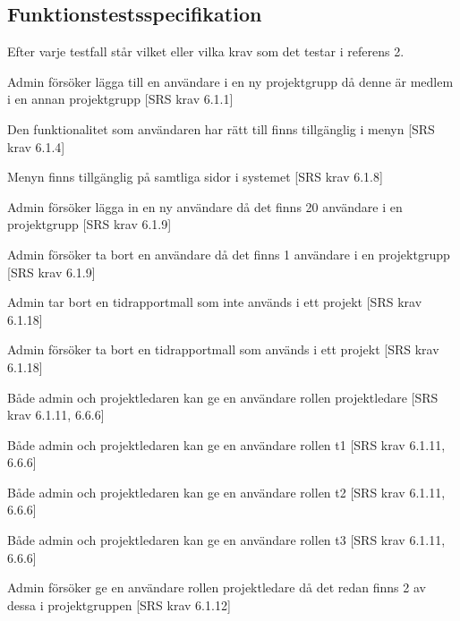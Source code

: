 \documentclass[a4paper]{article}
\begin{document}
\begin{appendices}

\section{Funktionstestsspecifikation}
Efter varje testfall står vilket eller vilka krav som det testar i referens 2.

\begin{FT}


\item
Admin försöker lägga till en användare i en ny projektgrupp då denne är medlem i en annan projektgrupp [SRS krav 6.1.1]

\item
Den funktionalitet som användaren har rätt till finns tillgänglig i menyn [SRS krav 6.1.4]

\item
Menyn finns tillgänglig på samtliga sidor i systemet [SRS krav 6.1.8]

\item
Admin försöker lägga in en ny användare då det finns 20 användare i en projektgrupp [SRS krav 6.1.9]

\item
Admin försöker ta bort en användare då det finns 1 användare i en projektgrupp [SRS krav 6.1.9]

\item
Admin tar bort en tidrapportmall som inte används i ett projekt [SRS krav 6.1.18]

\item
Admin försöker ta bort en tidrapportmall som används i ett projekt [SRS krav 6.1.18]

\item
Både admin och projektledaren kan ge en användare rollen projektledare [SRS krav 6.1.11, 6.6.6]

\item
Både admin och projektledaren kan ge en användare rollen t1 [SRS krav 6.1.11, 6.6.6]

\item
Både admin och projektledaren kan ge en användare rollen t2 [SRS krav 6.1.11, 6.6.6]

\item
Både admin och projektledaren kan ge en användare rollen t3 [SRS krav 6.1.11, 6.6.6]

\item
Admin försöker ge en användare rollen projektledare då det redan finns 2 av dessa i projektgruppen [SRS krav 6.1.12]


\end{FT}
\end{appendices}
\end{document}
